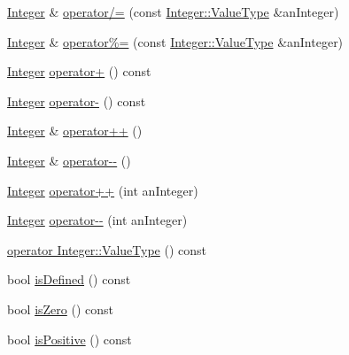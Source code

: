 \begin{DoxyCompactItemize}
\item 
\hyperlink{classostk_1_1core_1_1types_1_1_integer}{Integer} \& \hyperlink{classostk_1_1core_1_1types_1_1_integer_a9ae1562a37538a626a820c4205bb9ccf}{operator/=} (const \hyperlink{classostk_1_1core_1_1types_1_1_integer_a76a5f41f78659f116eafaf26cecc3244}{Integer\+::\+Value\+Type} \&an\+Integer)
\item 
\hyperlink{classostk_1_1core_1_1types_1_1_integer}{Integer} \& \hyperlink{classostk_1_1core_1_1types_1_1_integer_a534adb3e7ce4395443cd06b64290092e}{operator\%=} (const \hyperlink{classostk_1_1core_1_1types_1_1_integer_a76a5f41f78659f116eafaf26cecc3244}{Integer\+::\+Value\+Type} \&an\+Integer)
\item 
\hyperlink{classostk_1_1core_1_1types_1_1_integer}{Integer} \hyperlink{classostk_1_1core_1_1types_1_1_integer_a719e4eb6343b460fc6bd75dfea912074}{operator+} () const
\item 
\hyperlink{classostk_1_1core_1_1types_1_1_integer}{Integer} \hyperlink{classostk_1_1core_1_1types_1_1_integer_ab419e008180d0c5273c9f003aea4697e}{operator-\/} () const
\item 
\hyperlink{classostk_1_1core_1_1types_1_1_integer}{Integer} \& \hyperlink{classostk_1_1core_1_1types_1_1_integer_a8c53d280f9b065ef974a64d5635c78c6}{operator++} ()
\item 
\hyperlink{classostk_1_1core_1_1types_1_1_integer}{Integer} \& \hyperlink{classostk_1_1core_1_1types_1_1_integer_a215b90bea03a234250e875f3e0c2cb63}{operator-\/-\/} ()
\item 
\hyperlink{classostk_1_1core_1_1types_1_1_integer}{Integer} \hyperlink{classostk_1_1core_1_1types_1_1_integer_a5a627e346db7f0da6565df50f19d4693}{operator++} (int an\+Integer)
\item 
\hyperlink{classostk_1_1core_1_1types_1_1_integer}{Integer} \hyperlink{classostk_1_1core_1_1types_1_1_integer_ab948c97942688344d60c56bd37630421}{operator-\/-\/} (int an\+Integer)
\item 
\hyperlink{classostk_1_1core_1_1types_1_1_integer_a839600539c81b5753dd9f64c7314c17e}{operator Integer\+::\+Value\+Type} () const
\item 
bool \hyperlink{classostk_1_1core_1_1types_1_1_integer_a83f89f4a9dfa445de73e6948bda83607}{is\+Defined} () const
\item 
bool \hyperlink{classostk_1_1core_1_1types_1_1_integer_a24499a37fb811287dfc071b334e5c18c}{is\+Zero} () const
\item 
bool \hyperlink{classostk_1_1core_1_1types_1_1_integer_a79bb130d943874f17986d170d3f1f2fc}{is\+Positive} () const

\end{DoxyCompactItemize}
